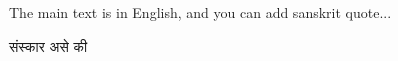 \documentclass[12pt]{article}
\begin{document}
The main text is in English, and you can add sanskrit quote...

\begin{sanskrit}

संस्कार असे की

\end{sanskrit}
\end{document}
